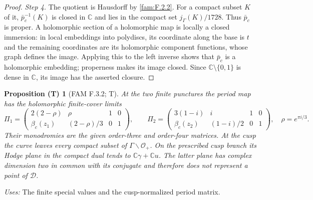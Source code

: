 \documentclass[11pt,a4paper]{article}
\theoremstyle{plain}
\newtheorem{proposition}[theorem]{Proposition (T)}
\theoremstyle{definition}
\begin{document}
\begin{proof}
\par\noindent\textit{Step 4.} The quotient is Hausdorff by \ref{fam:F.2.2}.  For a compact subset $K$ of it,
$\bar p_c^{-1}(K)$ is closed in $\mathbb C$ and lies in the compact set
$j_\Gamma(K)/1728$.  Thus $\bar p_c$ is proper.  A holomorphic section of
a holomorphic map is locally a closed immersion: in local embeddings
into polydiscs, its coordinate along the base is $t$ and the remaining
coordinates are its holomorphic component functions, whose graph
defines the image.  Applying this to the left inverse shows that
$\bar p_c$ is a holomorphic embedding; properness makes its image
closed.  Since $\mathbb C\setminus\{0,1\}$ is dense in $\mathbb C$, its
image has the asserted closure.
\end{proof}

\begin{proposition}[FAM F.3.2; T]\label{fam:F.3.2}
At the two finite punctures the period map has the holomorphic
finite-cover limits
\[
 \Pi_1=
 \begin{pmatrix}2(2-\rho)&\rho&1&0\\
 \beta_c(z_1)&(2-\rho)/3&0&1\end{pmatrix},\qquad
 \Pi_2=
 \begin{pmatrix}3(1-i)&i&1&0\\
 \beta_c(z_2)&(1-i)/2&0&1\end{pmatrix},
 \quad \rho=e^{\pi i/3}.
\]
Their monodromies are the given order-three and order-four matrices.
At the cusp the curve leaves every compact subset of
$\Gamma\backslash\mathcal O_+$.  On the prescribed cusp branch its
Hodge plane in the compact dual tends to
$\mathbb C\gamma+\mathbb Cu$.  The latter plane has complex dimension
two in common with its conjugate and therefore does not represent a
point of $\mathcal D$.
\end{proposition}
\noindent\emph{Uses:} The finite special values and the cusp-normalized period matrix.\par
\end{document}
